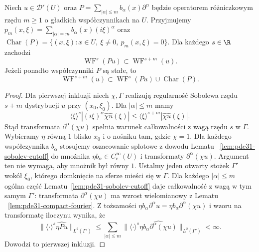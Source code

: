 \begin{twierdzenie}
\label{thm:pde31-sobolev-ellipticity}
Niech $u\in\mathcal D'(U)$ oraz
$P=\sum_{|\alpha|\le m}b_\alpha(x)\partial^\alpha$
będzie operatorem różniczkowym rzędu $m\ge1$
o gładkich współczynnikach na $U$.
Przyjmujemy
$p_m(x,\xi)=\sum_{|\alpha|=m}b_\alpha(x)(i\xi)^\alpha$
oraz $\operatorname{Char}(P)=\{(x,\xi):x\in U,\
\xi\ne0,\ p_m(x,\xi)=0\}$.
Dla każdego $s\in\R$
zachodzi
\[
 \operatorname{WF}^{s}(Pu)\subset
 \operatorname{WF}^{s+m}(u).
\]
Jeżeli ponadto współczynniki $P$ są stałe, to
\[
 \operatorname{WF}^{s+m}(u)\subset
 \operatorname{WF}^{s}(Pu)\cup\operatorname{Char}(P).
\]
\end{twierdzenie}
\begin{proof}
Dla pierwszej inkluzji niech $\chi,\Gamma$
realizują regularność Sobolewa rzędu $s+m$
dystrybucji $u$ przy $(x_0,\xi_0)$.
Dla $|\alpha|\le m$ mamy
\[
 \langle\xi\rangle^s
 |(i\xi)^\alpha\widehat{\chi u}(\xi)|
 \le\langle\xi\rangle^{s+m}|\widehat{\chi u}(\xi)|.
\]
Stąd transformata $\partial^\alpha(\chi u)$
spełnia warunek całkowalności z wagą rzędu $s$
w $\Gamma$. Wybieramy $\eta$ równą $1$ blisko
$x_0$ i o nośniku tam, gdzie $\chi=1$.
Dla każdego współczynnika $b_\alpha$ stosujemy
oszacowanie splotowe z dowodu Lematu
~\ref{lem:pde31-sobolev-cutoff} do mnożnika
$\eta b_\alpha\in C_c^\infty(U)$ i transformaty
$\partial^\alpha(\chi u)$. Argument ten
nie wymaga, aby mnożnik był równy $1$.
Ustalmy jeden otwarty stożek $\Gamma'$ wokół
$\xi_0$, którego domknięcie na sferze mieści się
w $\Gamma$. Dla każdego $|\alpha|\le m$ ogólna
część Lematu~\ref{lem:pde31-sobolev-cutoff}
daje całkowalność z wagą w tym samym $\Gamma'$:
transformata $\partial^\alpha(\chi u)$ ma
wzrost wielomianowy z Lematu
~\ref{lem:pde31-compact-fourier}.
Z tożsamości $\eta b_\alpha\partial^\alpha u
=\eta b_\alpha\partial^\alpha(\chi u)$ i wzoru
na transformatę iloczynu wynika, że
\[
 \|\langle\cdot\rangle^s\widehat{\eta Pu}\|_{L^2(\Gamma')}
 \le \sum_{|\alpha|\le m}
 \|\langle\cdot\rangle^s
 \widehat{\eta b_\alpha\partial^\alpha(\chi u)}
 \|_{L^2(\Gamma')}<\infty .
\]
Dowodzi to pierwszej inkluzji.


\end{proof}
